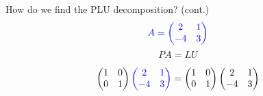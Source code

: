 \documentclass{beamer}
\begin{document}
\begin{frame}{How do we find the PLU decomposition? (cont.)}
    \[\textcolor{blue}{A=
        \begin{pmatrix}{}
            2 & 1 \\
            -4 & 3 \\
        \end{pmatrix}}
    \]
   \[PA=LU
   \]

    \[\begin{pmatrix}{}
            1 & 0 \\
            0 & 1 \\
            \end{pmatrix}\textcolor{blue}{\begin{pmatrix}{}
            2 & 1 \\
            -4 & 3 \\
        \end{pmatrix}}
        =\begin{pmatrix}{}
            1 & 0 \\
            0 & 1 \\
        \end{pmatrix}
        \begin{pmatrix}{}
            2 & 1 \\
            -4 & 3 \\
        \end{pmatrix}
    \]


\end{frame}
\end{document}
